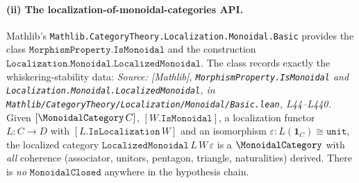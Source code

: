 \paragraph{(ii) The localization-of-monoidal-categories API.} Mathlib's
\texttt{Mathlib.CategoryTheory.Localization.Monoidal.Basic} provides the class
\(\mathtt{MorphismProperty.IsMonoidal}\) and the construction
\(\mathtt{Localization.Monoidal.LocalizedMonoidal}\). The class records exactly
the whiskering-stability data:
\textit{Source: [Mathlib], \texttt{MorphismProperty.IsMonoidal} and
\texttt{Localization.Monoidal.LocalizedMonoidal}, in
\texttt{Mathlib/CategoryTheory/Localization/Monoidal/Basic.lean}, L44--L440.}
Given \([\MonoidalCategory\,C]\), \([W.\mathtt{IsMonoidal}]\), a localization
functor \(L : C \to D\) with \([L.\mathtt{IsLocalization}\,W]\) and an isomorphism
\(\varepsilon : L(\mathbf{1}_C) \cong \mathtt{unit}\), the localized category
\(\mathtt{LocalizedMonoidal}\,L\,W\,\varepsilon\) is a \(\MonoidalCategory\) with
\emph{all} coherence (associator, unitors, pentagon, triangle, naturalities)
derived. There is \emph{no} \(\mathtt{MonoidalClosed}\) anywhere in the
hypothesis chain.

